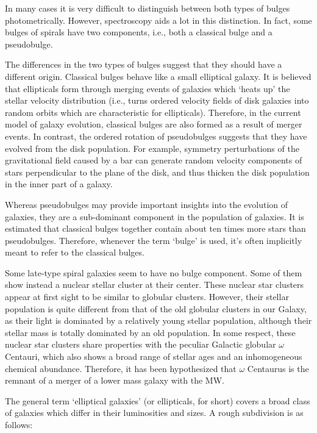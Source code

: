 \documentclass[a4paper,11pt]{article}
\begin{document}
{\noindent}In many cases it is very difficult to distinguish between both types of bulges photometrically. However, spectroscopy aids a lot in this distinction. In fact, some bulges of spirals have two components, i.e., both a classical bulge and a pseudobulge.

{\noindent}The differences in the two types of bulges suggest that they should have a different origin. Classical bulges behave like a small elliptical galaxy. It is believed that ellipticals form through merging events of galaxies which `heats up' the stellar velocity distribution (i.e., turns ordered velocity fields of disk galaxies into random orbits which are characteristic for ellipticals). Therefore, in the current model of galaxy evolution, classical bulges are also formed as a result of merger events. In contrast, the ordered rotation of pseudobulges suggests that they have evolved from the disk population. For example, symmetry perturbations of the gravitational field caused by a bar can generate random velocity components of stars perpendicular to the plane of the disk, and thus thicken the disk population in the inner part of a galaxy.

{\noindent}Whereas pseudobulges may provide important insights into the evolution of galaxies, they are a sub-dominant component in the population of galaxies. It is estimated that classical bulges together contain about ten times more stars than pseudobulges. Therefore, whenever the term `bulge' is used, it's often implicitly meant to refer to the classical bulges.

{\noindent}Some late-type spiral galaxies seem to have no bulge component. Some of them show instead a nuclear stellar cluster at their center. These nuclear star clusters appear at first sight to be similar to globular clusters. However, their stellar population is quite different from that of the old globular clusters in our Galaxy, as their light is dominated by a relatively young stellar population, although their stellar mass is totally dominated by an old population. In some respect, these nuclear star clusters share properties with the peculiar Galactic globular $\omega$ Centauri, which also shows a broad range of stellar ages and an inhomogeneous chemical abundance. Therefore, it has been hypothesized that $\omega$ Centaurus is the remnant of a merger of a lower mass galaxy with the MW.

{\noindent}The general term `elliptical galaxies' (or ellipticals, for short) covers a broad class of galaxies which differ in their luminosities and sizes. A rough subdivision is as follows:
\end{document}
